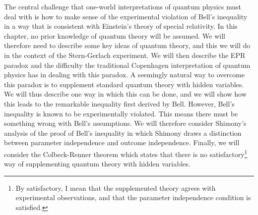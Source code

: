    The central challenge that one-world interpretations of quantum physics must deal with is how to make sense of the experimental violation of Bell's inequality in a way that is consistent with Einstein's theory of special relativity. In this chapter, no  prior knowledge of quantum theory will be assumed. We will therefore need to describe some key ideas of quantum theory, and this we will do in the context of the  Stern-Gerlach experiment. 
    We will then describe the EPR paradox and the difficulty the traditional Copenhagen interpretation of quantum physics has in dealing with this paradox. A seemingly natural way to overcome this paradox is to supplement standard quantum theory with hidden variables. We will thus describe one way in which this can be done, and we will show how this leads to the remarkable inequality first derived by Bell. However, Bell's inequality is known to be experimentally violated. This means there must be something wrong with Bell's assumptions. We will therefore consider Shimony's analysis of the proof of Bell's inequality in which Shimony draws a distinction between parameter independence and outcome independence. Finally, we will consider the Colbeck-Renner theorem which states that there is no satisfactory\footnote{By satisfactory, I mean that the supplemented theory agrees with experimental observations, and that the parameter independence condition is satisfied.} way of supplementing quantum theory with hidden variables.


    
